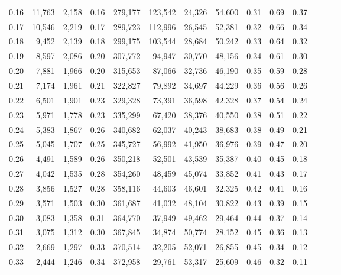 \begin{tabular}{rrrrrrrrrrrrrr}
0.16 &  11,763 &  2,158 &  0.16 &  279,177 &  123,542 &  24,326 &  54,600 &  0.31 &  0.69 &      0.37 \\
0.17 &  10,546 &  2,219 &  0.17 &  289,723 &  112,996 &  26,545 &  52,381 &  0.32 &  0.66 &      0.34 \\
0.18 &   9,452 &  2,139 &  0.18 &  299,175 &  103,544 &  28,684 &  50,242 &  0.33 &  0.64 &      0.32 \\
0.19 &   8,597 &  2,086 &  0.20 &  307,772 &   94,947 &  30,770 &  48,156 &  0.34 &  0.61 &      0.30 \\
0.20 &   7,881 &  1,966 &  0.20 &  315,653 &   87,066 &  32,736 &  46,190 &  0.35 &  0.59 &      0.28 \\
0.21 &   7,174 &  1,961 &  0.21 &  322,827 &   79,892 &  34,697 &  44,229 &  0.36 &  0.56 &      0.26 \\
0.22 &   6,501 &  1,901 &  0.23 &  329,328 &   73,391 &  36,598 &  42,328 &  0.37 &  0.54 &      0.24 \\
0.23 &   5,971 &  1,778 &  0.23 &  335,299 &   67,420 &  38,376 &  40,550 &  0.38 &  0.51 &      0.22 \\
0.24 &   5,383 &  1,867 &  0.26 &  340,682 &   62,037 &  40,243 &  38,683 &  0.38 &  0.49 &      0.21 \\
0.25 &   5,045 &  1,707 &  0.25 &  345,727 &   56,992 &  41,950 &  36,976 &  0.39 &  0.47 &      0.20 \\
0.26 &   4,491 &  1,589 &  0.26 &  350,218 &   52,501 &  43,539 &  35,387 &  0.40 &  0.45 &      0.18 \\
0.27 &   4,042 &  1,535 &  0.28 &  354,260 &   48,459 &  45,074 &  33,852 &  0.41 &  0.43 &      0.17 \\
0.28 &   3,856 &  1,527 &  0.28 &  358,116 &   44,603 &  46,601 &  32,325 &  0.42 &  0.41 &      0.16 \\
0.29 &   3,571 &  1,503 &  0.30 &  361,687 &   41,032 &  48,104 &  30,822 &  0.43 &  0.39 &      0.15 \\
0.30 &   3,083 &  1,358 &  0.31 &  364,770 &   37,949 &  49,462 &  29,464 &  0.44 &  0.37 &      0.14 \\
0.31 &   3,075 &  1,312 &  0.30 &  367,845 &   34,874 &  50,774 &  28,152 &  0.45 &  0.36 &      0.13 \\
0.32 &   2,669 &  1,297 &  0.33 &  370,514 &   32,205 &  52,071 &  26,855 &  0.45 &  0.34 &      0.12 \\
0.33 &   2,444 &  1,246 &  0.34 &  372,958 &   29,761 &  53,317 &  25,609 &  0.46 &  0.32 &      0.11 \\

\end{tabular}
